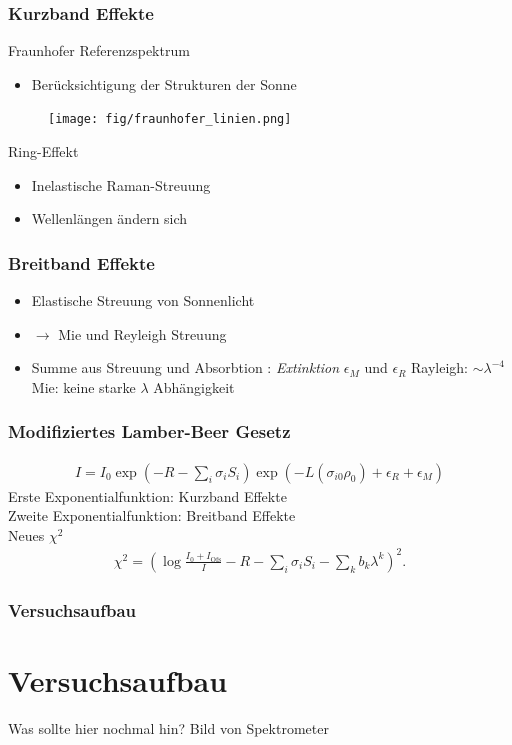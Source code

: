 \documentclass{beamer}
\begin{document}
\begin{frame}
    \frametitle{Kurzband Effekte}
Fraunhofer Referenzspektrum
    \begin{itemize}
        \item Berücksichtigung der Strukturen der Sonne
    \end{itemize}
    \begin{figure}[h]
        \texttt{[image: fig/fraunhofer\_linien.png]}
    \end{figure}
\pause
    Ring-Effekt
    \begin{itemize}
        \item Inelastische Raman-Streuung
        \item Wellenlängen ändern sich
    \end{itemize}
\end{frame}

\begin{frame}
    \frametitle{Breitband Effekte}
    \begin{itemize}
        \item Elastische Streuung von Sonnenlicht 
        \item $\to$ Mie und Reyleigh Streuung
        \item Summe aus Streuung und Absorbtion : \textit{Extinktion} $\epsilon_M$ und $\epsilon_R$
    Rayleigh: $\sim \lambda^{-4}$\\
    Mie: keine starke $\lambda$ Abhängigkeit
    \end{itemize}
\end{frame}


\begin{frame}
    \frametitle{Modifiziertes Lamber-Beer Gesetz}
    \begin{align}
        I = I_0 \exp(-R - \sum_i \sigma_i S_i) \exp (-L (\sigma_{i0}\rho_0) + \epsilon_R + \epsilon_M)
    \end{align}
    Erste Exponentialfunktion: Kurzband Effekte\\
    Zweite Exponentialfunktion: Breitband Effekte\\
    \pause
    Neues $\chi^2$
    \begin{align}
        \chi^2 = ( \log\frac{I_0 + I_\text{Ofs}}{I} - R - \sum_i \sigma_i S_i - \sum_k b_k \lambda^k )^2.
    \end{align}
\end{frame}

\begin{frame}
    \frametitle{Versuchsaufbau}
    \section{Versuchsaufbau}
    Was sollte hier nochmal hin?
    Bild von Spektrometer
\end{frame}
\end{document}
